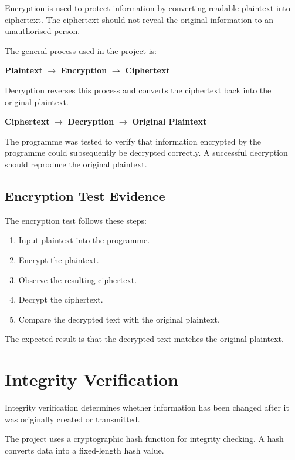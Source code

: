 \documentclass[12pt,a4paper]{article}
\begin{document}
Encryption is used to protect information by converting readable
plaintext into ciphertext. The ciphertext should not reveal the original
information to an unauthorised person.

The general process used in the project is:

\begin{center}
\textbf{Plaintext}
$\rightarrow$
\textbf{Encryption}
$\rightarrow$
\textbf{Ciphertext}
\end{center}

Decryption reverses this process and converts the ciphertext back into
the original plaintext.

\begin{center}
\textbf{Ciphertext}
$\rightarrow$
\textbf{Decryption}
$\rightarrow$
\textbf{Original Plaintext}
\end{center}

The programme was tested to verify that information encrypted by the
programme could subsequently be decrypted correctly. A successful
decryption should reproduce the original plaintext.

\subsection{Encryption Test Evidence}

The encryption test follows these steps:

\begin{enumerate}
    \item Input plaintext into the programme.
    \item Encrypt the plaintext.
    \item Observe the resulting ciphertext.
    \item Decrypt the ciphertext.
    \item Compare the decrypted text with the original plaintext.
\end{enumerate}

The expected result is that the decrypted text matches the original
plaintext.

\section{Integrity Verification}

Integrity verification determines whether information has been changed
after it was originally created or transmitted.

The project uses a cryptographic hash function for integrity checking.
A hash converts data into a fixed-length hash value.
\end{document}
